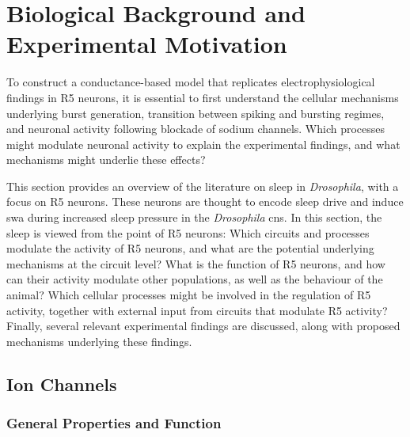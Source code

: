 \documentclass[../main.tex]{subfiles}
\begin{document}

\section{Biological Background and Experimental Motivation} \label{sec:sleep_and_r5_network}


To construct a conductance-based model that replicates electrophysiological findings in R5 neurons, it is essential to first understand the cellular mechanisms underlying burst generation, transition between spiking and bursting regimes, and neuronal activity following blockade of sodium channels.
Which processes might modulate neuronal activity to explain the experimental findings, and what mechanisms might underlie these effects?

This section provides an overview of the literature on sleep in \textit{Drosophila}, with a focus on R5 neurons. These neurons are thought to encode sleep drive and induce \gls{swa} during increased sleep pressure in the \textit{Drosophila}
\gls{cns}. In this section, the sleep is viewed from the point of R5 neurons: Which circuits and processes modulate the activity of R5 neurons, and what are the potential underlying mechanisms at the circuit level? What is the function of R5 neurons, and how can their activity modulate other populations, as well as the behaviour of the animal? Which cellular processes might be involved in the regulation of R5 activity, together with external input from circuits that modulate R5 activity? Finally, several relevant experimental findings are discussed, along with proposed mechanisms underlying these findings.


\subsection{Ion Channels} \label{subsec:ion_channels}
\subsubsection{General Properties and Function}\label{subsubsec:ion_channel_properties_and_function}
\end{document}
